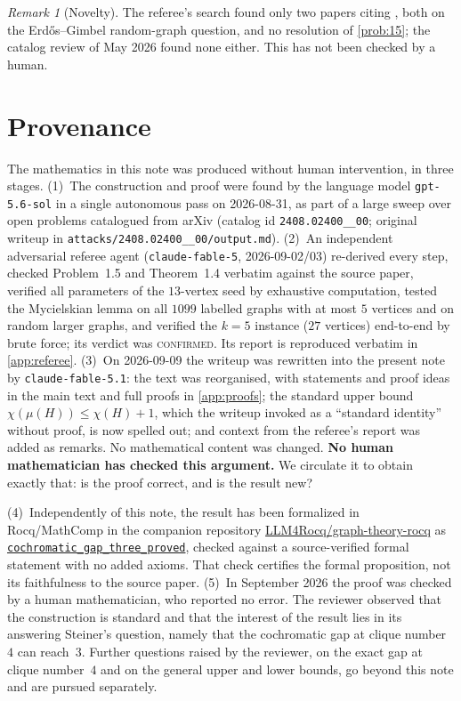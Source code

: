 \documentclass[11pt,a4paper]{article}
\theoremstyle{plain}
\theoremstyle{definition}
\theoremstyle{remark}
\newtheorem{remark}[theorem]{Remark}
\newcommand{\myc}{\mu}
\begin{document}
\begin{remark}[Novelty]
The referee's search found only two papers citing \cite{Steiner24}, both on the Erdős--Gimbel random-graph question, and no resolution of \cref{prob:15}; the catalog review of May 2026 found none either. This has not been checked by a human.
\end{remark}

\section{Provenance}\label{sec:provenance}

The mathematics in this note was produced without human intervention, in three stages.
(1)~The construction and proof were found by the language model \texttt{gpt-5.6-sol} in a single autonomous pass on 2026-08-31, as part of a large sweep over open problems catalogued from arXiv (catalog id \texttt{2408.02400\_\_00}; original writeup in \texttt{attacks/2408.02400\_\_00/output.md}).
(2)~An independent adversarial referee agent (\texttt{claude-fable-5}, 2026-09-02/03) re-derived every step, checked Problem~1.5 and Theorem~1.4 verbatim against the source paper, verified all parameters of the $13$-vertex seed by exhaustive computation, tested the Mycielskian lemma on all $1099$ labelled graphs with at most $5$ vertices and on random larger graphs, and verified the $k=5$ instance ($27$ vertices) end-to-end by brute force; its verdict was \textsc{confirmed}. Its report is reproduced verbatim in \cref{app:referee}.
(3)~On 2026-09-09 the writeup was rewritten into the present note by \texttt{claude-fable-5.1}: the text was reorganised, with statements and proof ideas in the main text and full proofs in \cref{app:proofs}; the standard upper bound $\chi(\myc(H))\le\chi(H)+1$, which the writeup invoked as a ``standard identity'' without proof, is now spelled out; and context from the referee's report was added as remarks. No mathematical content was changed.
\textbf{No human mathematician has checked this argument.} We circulate it to obtain exactly that: is the proof correct, and is the result new?

 (4)~Independently of this note, the result has been formalized in Rocq/MathComp in the companion repository \href{https://github.com/LLM4Rocq/graph-theory-rocq}{LLM4Rocq/graph-theory-rocq} as \href{https://github.com/LLM4Rocq/graph-theory-rocq/blob/main/chromatic-theory/theories/applications/cochromatic_gap/cochromatic_gap.v}{\texttt{cochromatic\_gap\_three\_proved}}, checked against a source-verified formal statement with no added axioms. That check certifies the formal proposition, not its faithfulness to the source paper.
 (5)~In September 2026 the proof was checked by a human mathematician, who reported no error. The reviewer observed that the construction is standard and that the interest of the result lies in its answering Steiner's question, namely that the cochromatic gap at clique number~$4$ can reach~$3$. Further questions raised by the reviewer, on the exact gap at clique number~$4$ and on the general upper and lower bounds, go beyond this note and are pursued separately.
\end{document}
